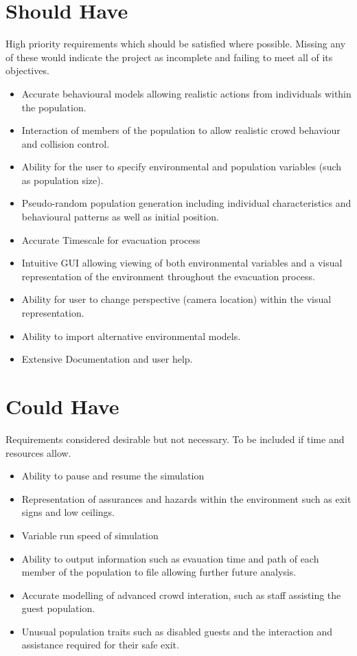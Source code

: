 \section{Should Have}

High priority requirements which should be satisfied where possible.
Missing any of these would indicate the project as incomplete and
failing to meet all of its objectives.
\begin{itemize}
\item Accurate behavioural models allowing realistic actions from individuals
within the population.
\item Interaction of members of the population to allow realistic crowd
behaviour and collision control.
\item Ability for the user to specify environmental and population variables
(such as population size).
\item Pseudo-random population generation including individual characteristics
and behavioural patterns as well as initial position.
\item Accurate Timescale for evacuation process
\item Intuitive GUI allowing viewing of both environmental variables and
a visual representation of the environment throughout the evacuation
process.
\item Ability for user to change perspective (camera location) within the
visual representation.
\item Ability to import alternative environmental models.
\item Extensive Documentation and user help.
\end{itemize}

\section{Could Have}

Requirements considered desirable but not necessary. To be included
if time and resources allow.
\begin{itemize}
\item Ability to pause and resume the simulation
\item Representation of assurances and hazards within the environment such
as exit signs and low ceilings.
\item Variable run speed of simulation
\item Ability to output information such as evauation time and path of each
member of the population to file allowing further future analysis.
\item Accurate modelling of advanced crowd interation, such as staff assisting
the guest population.
\item Unusual population traits such as disabled guests and the interaction
and assistance required for their safe exit.
\end{itemize}

